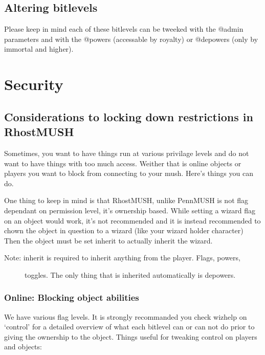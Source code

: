 \documentclass[letterpaper,10pt,english]{sphinxmanual}
\begin{document}
\section{Altering bitlevels}
\label{\detokenize{toggles:altering-bitlevels}}
\sphinxAtStartPar
Please keep in mind each of these bitlevels can be tweeked with the @admin
parameters and with the @powers (accessable by royalty) or @depowers (only
by immortal and higher).


\chapter{Security}
\label{\detokenize{security:security}}\label{\detokenize{security::doc}}

\section{Considerations to locking down restrictions in RhostMUSH}
\label{\detokenize{security:considerations-to-locking-down-restrictions-in-rhostmush}}
\sphinxAtStartPar
Sometimes, you want to have things run at various privilage levels and do not
want to have things with too much access.  Weither that is online objects or
players you want to block from connecting to your mush.  Here’s things you can
do.

\sphinxAtStartPar
One thing to keep in mind is that RhostMUSH, unlike PennMUSH is not flag
dependant on permission level, it’s ownership based.  While setting a wizard
flag on an object would work, it’s not recommended and it is instead recommended
to chown the object in question to a wizard (like your wizard holder character)
Then the object must be set inherit to actually inherit the wizard.
\begin{description}
\item[{Note: inherit is required to inherit anything from the player.  Flags, powers,}] \leavevmode
\sphinxAtStartPar
toggles.  The only thing that is inherited automatically is depowers.

\end{description}


\subsection{Online: Blocking object abilities}
\label{\detokenize{security:online-blocking-object-abilities}}
\sphinxAtStartPar
We have various flag levels.  It is strongly recommanded you check wizhelp
on ‘control’ for a detailed overview of what each bitlevel can or can not do
prior to giving the ownership to the object.  Things useful for tweaking control
on players and objects:
\end{document}
